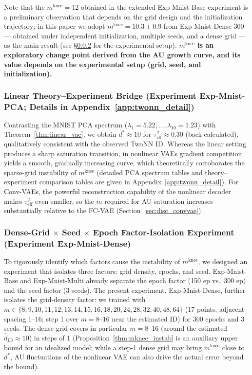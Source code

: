 \documentclass[make,article,submit,pdftex,moreauthors]{Definitions/mdpi}
\newcommand{\mknee}{m^{\mathrm{knee}}}
\begin{document}
Note that the $\mknee = 12$ obtained in the extended Exp-Mnist-Base experiment is a
preliminary observation that depends on the grid design and the initialization trajectory;
in this paper we adopt $\mknee = 10.3 \pm 0.9$ from Exp-Mnist-Dense-300 --- obtained under
independent initialization, multiple seeds, and a dense grid --- as the main result
(see \S\ref{sec:exp_el} for the experimental setup).
\textbf{$\mknee$ is an exploratory change point derived from the AU growth curve, and its
value depends on the experimental setup (grid, seed, and initialization).}

\subsubsection{Linear Theory--Experiment Bridge (Experiment Exp-Mnist-PCA; Details in Appendix~\ref{app:twonn_detail})}\label{sec:exp_em}

Contrasting the MNIST PCA spectrum ($\lambda_1=5.22, \ldots, \lambda_{10}=1.23$) with
Theorem~\ref{thm:linear_vae}, we obtain $d^* \approx 10$ for
$\tau^2_\mathrm{eff} \approx 0.30$ (back-calculated), qualitatively consistent with the
observed TwoNN ID.
Whereas the linear setting produces a sharp saturation transition, in nonlinear VAEs gradient
competition yields a smooth, gradually increasing curve, which theoretically corroborates the
sparse-grid instability of $\mknee$ (detailed PCA spectrum tables and theory--experiment
comparison tables are given in Appendix~\ref{app:twonn_detail}).
For Conv-VAEs, the powerful reconstruction capability of the nonlinear decoder makes
$\tau^2_\mathrm{eff}$ even smaller, so the $m$ required for AU saturation increases
substantially relative to the FC-VAE (Section~\ref{sec:disc_convvae}).

\subsubsection{Dense-Grid $\times$ Seed $\times$ Epoch Factor-Isolation Experiment (Experiment Exp-Mnist-Dense)}\label{sec:exp_el}

To rigorously identify which factors cause the instability of $\mknee$, we designed an
experiment that isolates three factors: grid density, epochs, and seed.
Exp-Mnist-Base and Exp-Mnist-Multi already separate the epoch factor (150 ep vs.\ 300 ep) and
the seed factor (3 seeds).
The present experiment, Exp-Mnist-Dense, further isolates the grid-density factor: we trained
with $m \in \{8,9,10,11,12,13,14,15,16,18,20,24,28,32,40,48,64\}$
(17 points, adjacent spacing 1--16; step 1 over $m=8$--$16$ near the estimated ID) for 300 epochs and 3 seeds.
The dense grid covers in particular $m = 8$--16 (around the estimated
$\hat{d}_\mathrm{ID} \approx 10$) in steps of 1
(Proposition~\ref{thm:mknee_instab} is an auxiliary upper bound for an idealized model; while
a step-1 dense grid may bring $\mknee$ close to $d^*$, AU fluctuations of the nonlinear VAE
can also drive the actual error beyond the bound).
\end{document}
